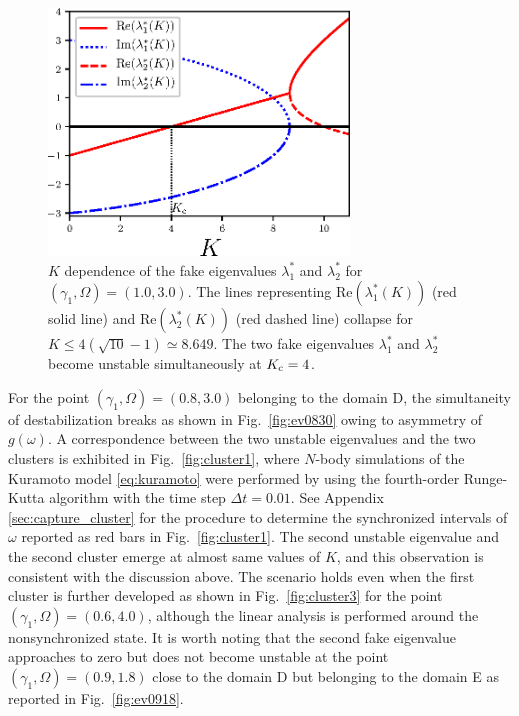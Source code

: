 \begin{figure}[htbp]
  \begin{center}
  \includegraphics[width=8cm]{figs/ev1030.eps}  
  \end{center}
  \caption{$K$ dependence of the
    fake eigenvalues $\lambda_{1}^{\ast}$ and $\lambda_{2}^{\ast}$
    for $(\gamma_{1},\Omega)=(1.0,3.0)$.
    The lines representing
    $\mathrm{Re}(\lambda_{1}^{\ast}(K))$ (red solid line)
    and $\mathrm{Re}(\lambda_{2}^{\ast}(K))$ (red dashed line)
    collapse for $K\leq 4(\sqrt{10}-1)\simeq 8.649$.
    The two fake eigenvalues $\lambda_{1}^{\ast}$ and $\lambda_{2}^{\ast}$
    become unstable simultaneously at $K_{\rm c}=4$.
  }
  \label{fig:ev1030}
\end{figure}


For the point $(\gamma_{1},\Omega)=(0.8,3.0)$
belonging to the domain D, 
the simultaneity of destabilization
breaks as shown in Fig.~\ref{fig:ev0830}
owing to asymmetry of $g(\omega)$.
A correspondence between the two unstable
eigenvalues and the two clusters is exhibited in Fig.~\ref{fig:cluster1},
where $N$-body simulations of the Kuramoto model \eqref{eq:kuramoto}
were performed by using the fourth-order Runge-Kutta algorithm
with the time step $\Delta t=0.01$.
See Appendix \ref{sec:capture_cluster}
  for the procedure to determine the synchronized intervals of $\omega$
  reported as red bars in Fig.~\ref{fig:cluster1}.
The second unstable eigenvalue and the second cluster emerge
  at almost same values of $K$,
  and this observation is consistent with the discussion above.
  The scenario holds even when the first cluster is further developed
  as shown in Fig.~\ref{fig:cluster3} for the point $(\gamma_{1},\Omega)=(0.6,4.0)$,
  although the linear analysis is performed around the
  nonsynchronized state.
  It is worth noting that the second fake eigenvalue approaches
  to zero but does not become unstable
  at the point $(\gamma_{1},\Omega)=(0.9,1.8)$
  close to the domain D but belonging to the domain E
  as reported in Fig.~\ref{fig:ev0918}.


